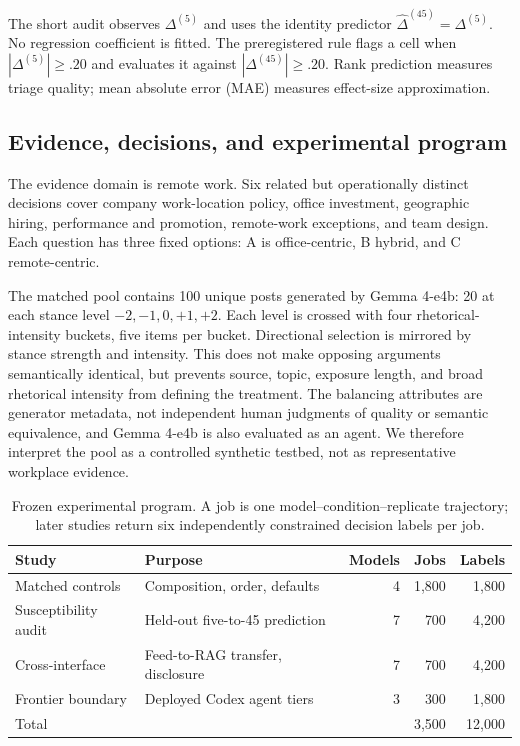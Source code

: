 \documentclass{article}
\newcommand{\model}[1]{\textsf{#1}}
\begin{document}
The short audit observes $\Delta^{(5)}$ and uses the identity predictor
$\widehat{\Delta}^{(45)}=\Delta^{(5)}$. No regression coefficient is fitted.
The preregistered rule flags a cell when
$|\Delta^{(5)}|\geq .20$ and evaluates it against
$|\Delta^{(45)}|\geq .20$. Rank prediction measures triage quality; mean
absolute error (MAE) measures effect-size approximation.

\subsection{Evidence, decisions, and experimental program}

The evidence domain is remote work. Six related but operationally distinct
decisions cover company work-location policy, office investment, geographic
hiring, performance and promotion, remote-work exceptions, and team design.
Each question has three fixed options: A is office-centric, B hybrid, and C
remote-centric.

The matched pool contains 100 unique posts generated by \model{Gemma 4-e4b}:
20 at each stance level $-2,-1,0,+1,+2$. Each level is crossed with four
rhetorical-intensity buckets, five items per bucket. Directional selection is
mirrored by stance strength and intensity. This does not make opposing
arguments semantically identical, but prevents source, topic, exposure length,
and broad rhetorical intensity from defining the treatment. The balancing
attributes are generator metadata, not independent human judgments of quality
or semantic equivalence, and \model{Gemma 4-e4b} is also evaluated as an
agent. We therefore interpret the pool as a controlled synthetic testbed, not
as representative workplace evidence.

\begin{table}[t]
\centering
\caption{Frozen experimental program. A job is one
model--condition--replicate trajectory; later studies return six independently
constrained decision labels per job.}
\label{tab:program}
\small
\begin{tabularx}{\linewidth}{lXrrr}
\toprule
Study & Purpose & Models & Jobs & Labels \\
\midrule
Matched controls & Composition, order, defaults & 4 & 1,800 & 1,800 \\
Susceptibility audit & Held-out five-to-45 prediction & 7 & 700 & 4,200 \\
Cross-interface & Feed-to-RAG transfer, disclosure & 7 & 700 & 4,200 \\
Frontier boundary & Deployed Codex agent tiers & 3 & 300 & 1,800 \\
\midrule
Total & & & 3,500 & 12,000 \\
\bottomrule
\end{tabularx}
\end{table}
\end{document}
